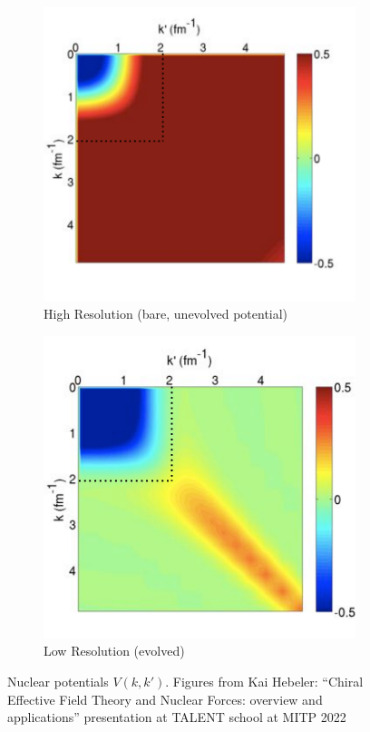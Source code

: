 \documentclass[a4paper,11pt]{article}
\begin{document}
\begin{figure}[h]
    \centering
    \begin{subfigure}{0.45\textwidth}
        \centering
        \includegraphics[width=\linewidth]{HighRes.png}
        \caption{High Resolution (bare, unevolved potential) }
        \label{fig:highres}
    \end{subfigure}
    \hfill
    \begin{subfigure}{0.45\textwidth}
        \centering
        \includegraphics[width=\linewidth]{LowRes.png}
        \caption{Low Resolution (evolved)}
        \label{fig:lowres}
    \end{subfigure}
    \caption{Nuclear potentials $V(k,k')$. Figures from Kai Hebeler: ``Chiral Effective Field Theory and Nuclear Forces:
overview and applications'' presentation at TALENT school at MITP 2022}
    \label{fig:SRGtransform}
\end{figure}
\end{document}
